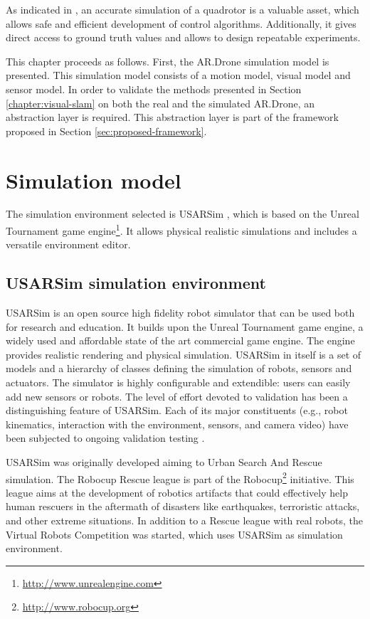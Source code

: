 As indicated in \cite{Michael2010ra}, an accurate simulation of a quadrotor is a valuable asset, which allows safe and efficient development of control algorithms. Additionally, it gives direct access to ground truth values and allows to design repeatable experiments.

This chapter proceeds as follows.
First, the AR.Drone simulation model is presented.
This simulation model consists of a motion model, visual model and sensor model.
In order to validate the methods presented in Section \ref{chapter:visual-slam} on both the real and the simulated AR.Drone, an abstraction layer is required.
This abstraction layer is part of the framework proposed in Section \ref{sec:proposed-framework}.

	\section{Simulation model}
The simulation environment selected is USARSim \cite{Balakirsky2009iros,carpin2007usarsim}, which is based on the Unreal Tournament game engine\footnote{\url{http://www.unrealengine.com}}.
It allows physical realistic simulations and includes a versatile environment editor.

		\subsection{USARSim simulation environment}
USARSim is an open source high fidelity robot simulator that can be used both for research and education.
It builds upon the Unreal Tournament game engine, a widely used and affordable state of the art commercial game engine.
The engine provides realistic rendering and physical simulation.
USARSim in itself is a set of models and a hierarchy of classes defining the simulation of robots, sensors and actuators.
The simulator is highly configurable and extendible: users can easily add new sensors or robots.
The level of effort devoted to validation has been a distinguishing feature of USARSim.
Each of its major constituents (e.g., robot kinematics, interaction with the environment, sensors, and camera video) have been subjected to ongoing validation testing \cite{formsma2011realistic,carpin2006high,wang2005validating,carpin2007bridging,carpin2006quantitative}.

USARSim was originally developed aiming to Urban Search And Rescue simulation.
The Robocup Rescue league is part of the Robocup\footnote{\url{http://www.robocup.org}} initiative.
This league aims at the development of robotics artifacts that could effectively help human rescuers in the aftermath of disasters like earthquakes, terroristic attacks, and other extreme situations.
In addition to a Rescue league with real robots, the Virtual Robots Competition was started, which uses USARSim as simulation environment.

